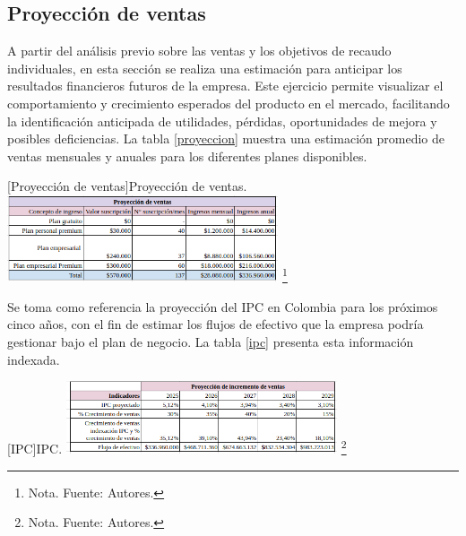 \subsection{Proyección de ventas}

A partir del análisis previo sobre las ventas y los objetivos de recaudo individuales, en esta sección se realiza una estimación para anticipar los resultados financieros futuros de la empresa. Este ejercicio permite visualizar el comportamiento y crecimiento esperados del producto en el mercado, facilitando la identificación anticipada de utilidades, pérdidas, oportunidades de mejora y posibles deficiencias. La tabla \ref{proyeccion} muestra una estimación promedio de ventas mensuales y anuales para los diferentes planes disponibles.

\vspace{2mm}
\begin{minipage}{0.9\textwidth}
\centering
{}[Proyección de ventas]{Proyección de ventas.}
\label{proyeccion}
\includegraphics[width=0.6\textwidth]{Content/Images/AF/Proyeccion_de_ventas.png}
\footnote{Nota. \textup{Fuente: Autores.}}
\end{minipage}

Se toma como referencia la proyección del IPC en Colombia para los próximos cinco años, con el fin de estimar los flujos de efectivo que la empresa podría gestionar bajo el plan de negocio. La tabla \ref{ipc} presenta esta información indexada.

\vspace{2mm}
\begin{minipage}{0.9\textwidth}
\centering
{}[IPC]{IPC.}
\label{ipc}
\includegraphics[width=0.6\textwidth]{Content/Images/AF/Proyeccion_de_incremento_ventas.png}
\footnote{Nota. \textup{Fuente: Autores.}}
\end{minipage}
